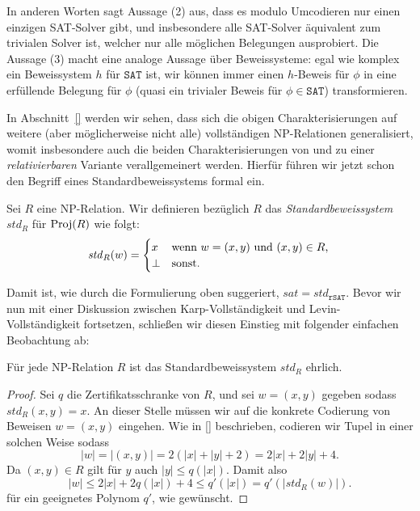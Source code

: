 In anderen Worten sagt Aussage (2) aus, dass es modulo Umcodieren nur einen einzigen SAT-Solver gibt, und insbesondere alle SAT-Solver äquivalent zum trivialen Solver ist, welcher nur alle möglichen Belegungen ausprobiert.
Die Aussage (3) macht eine analoge Aussage über Beweissysteme: egal wie komplex ein Beweissystem $h$ für $\mathtt{SAT}$ ist, wir können immer einen $h$-Beweis für $\phi$ in eine erfüllende Belegung für $\phi$ (quasi ein trivialer Beweis für $\phi\in\mathtt{SAT}$) transformieren.

In Abschnitt~\ref{} werden wir sehen, dass sich die obigen Charakterisierungen auf weitere (aber möglicherweise nicht alle) vollständigen NP-Relationen generalisiert, womit insbesondere auch die beiden Charakterisierungen von \citeauthor{fenner_inverting_2003} und \citeauthor{messner_simulation_2001} zu einer \emph{relativierbaren} Variante verallgemeinert werden. Hierfür führen wir jetzt schon den Begriff eines Standardbeweissystems formal ein.

\begin{definition}[Standardbeweissystem]
    Sei $R$ eine NP-Relation. Wir definieren bezüglich $R$ das \emph{Standardbeweissystem} $\mathit{std}_R$ für $\operatorname{Proj}(R)$ wie folgt:
    \[ \mathit{std}_R(w) = \begin{cases} x & \text{wenn $w=(x,y)$ und $(x,y)\in R$,}\\
    \bot & \text{sonst}.\end{cases} \qedhere \] 
\end{definition}
Damit ist, wie durch die Formulierung oben suggeriert, $\mathit{sat}=\mathit{std}_{\mathtt{rSAT}}$.
Bevor wir nun mit einer Diskussion zwischen Karp-Vollständigkeit und Levin-Vollständigkeit fortsetzen, schließen wir diesen Einstieg mit folgender einfachen Beobachtung ab:
\begin{observation}\label{obs:spps-honest}
    Für jede NP-Relation $R$ ist das Standardbeweissystem $\mathit{std}_R$ ehrlich.
\end{observation}
\begin{proof}
    Sei $q$ die Zertifikatsschranke von $R$, und sei $w=(x,y)$ gegeben sodass $\mathit{std}_R(x,y) = x$.
    An dieser Stelle müssen wir auf die konkrete Codierung von Beweisen $w=(x,y)$ eingehen.
    Wie in \ref{} beschrieben, codieren wir Tupel in einer solchen Weise sodass
    \[ |w| = |(x,y)| = 2(|x|+|y|+2) = 2|x|+ 2|y| + 4. \]
    Da $(x,y)\in R$ gilt für $y$ auch $|y|\leq q(|x|)$.
    Damit also
    \[ |w| \leq 2|x|+ 2q(|x|) + 4 \leq q'(|x|) = q'(|\mathit{std}_R(w)|). \]
    für ein geeignetes Polynom $q'$, wie gewünscht.
\end{proof}


